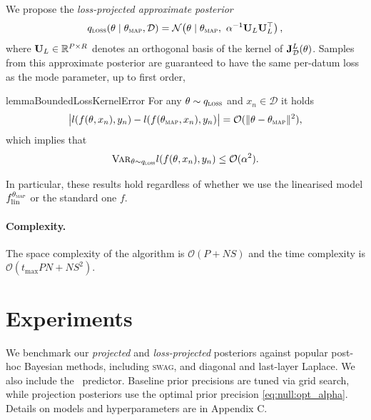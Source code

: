 We propose the \emph{loss-projected approximate posterior}
\begin{equation}
    q_{\textnormal{\textsc{loss}}}(\theta \mid \theta_{\textsc{map}}, \mathcal{D})
    =
    \mathcal{N}\!\left(\theta \mid \theta_{\textsc{map}},\ \alpha^{-1}\U_L\U_L\T \right),
    \label{eq:null:approx_post_loss}
\end{equation}
where $\mathbf{U}_L \in \mathbb{R}^{P \times R}$ denotes an orthogonal basis of the kernel of $\mathbf{J}^{L}_{\mathcal{D}}(\theta)$. Samples from this approximate posterior are guaranteed to have the same per-datum loss as the mode parameter, up to first order,
\begin{restatable}{lemma}{BoundedLossKernelError}
  \label{lm:null:loss_proj_err}
    For any $\theta\sim q_{\textnormal{\textsc{loss}}}$ and $x_n \in \mathcal{D}$ it holds
    \begin{align*}
        \big|l(f(\theta, x_n), y_n)
        -
        l(f(\theta_{\textsc{map}}, x_n), y_n)\big|
        = \mathcal{O}(\lVert \theta - \theta_{\textsc{map}} \rVert^2),
    \end{align*}
    which implies that
    \begin{equation}
        \textnormal{\textsc{Var}}_{\theta \sim q_{\textnormal{\textsc{loss}}}} l(f(\theta, x_n), y_n)
        \leq
        \mathcal{O}(\alpha^2) .
    \end{equation}
\end{restatable}
In particular, these results hold regardless of whether we use the linearised model $f_{\mathrm{lin}}^{\theta_{\textsc{map}}}$ or the standard one $f$.

\paragraph{Complexity.}
The space complexity of the algorithm is $\mathcal{O}(P + NS)$ and the time complexity is $\mathcal{O}(t_{\max}PN + N S^2)$.

\section{Experiments}
\label{sec:null_results}
We benchmark our \emph{projected} and \emph{loss-projected} posteriors against popular post-hoc Bayesian methods, including \textsc{swag}, and diagonal and last-layer Laplace. We also include the \MAP\ predictor.
Baseline prior precisions are tuned via grid search, while projection posteriors use the optimal prior precision \eqref{eq:null:opt_alpha}. Details on models and hyperparameters are in Appendix C.

